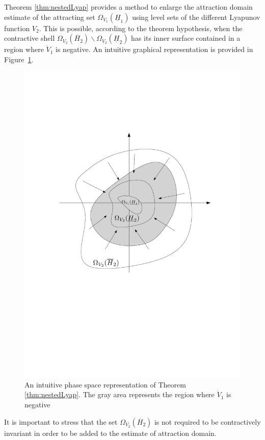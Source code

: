 \documentclass[letterpaper,10pt,twocolumn,journal,final]{IEEEtran}
\begin{document}
Theorem \ref{thm:nestedLyap} provides a method to enlarge the attraction domain estimate of the attracting set $\Omega_{V_1}(\underline H_1)$ using level sets of the different Lyapunov function $V_2$. This is possible, according to the theorem hypothesis, when the contractive shell $\Omega_{V_2}(\overline H_2)\backslash\Omega_{V_2}(\underline H_2)$ has its inner surface contained in a region where $\dot V_1$ is negative.
An intuitive graphical representation is provided in Figure~\ref{fig:nested lyap}.
\begin{figure}
	\centering
	\includegraphics[width=0.9\columnwidth]{NestedLyap}
	\caption{An intuitive phase space representation of Theorem \ref{thm:nestedLyap}. The gray area represents the region where $\dot V_1$ is negative
	\label{fig:nested lyap}}
\end{figure}
It is important to stress that the set $\Omega_{V_2}(\overline H_2)$ is not required to be contractively invariant in order to be added to the estimate of attraction domain.
\end{document}
